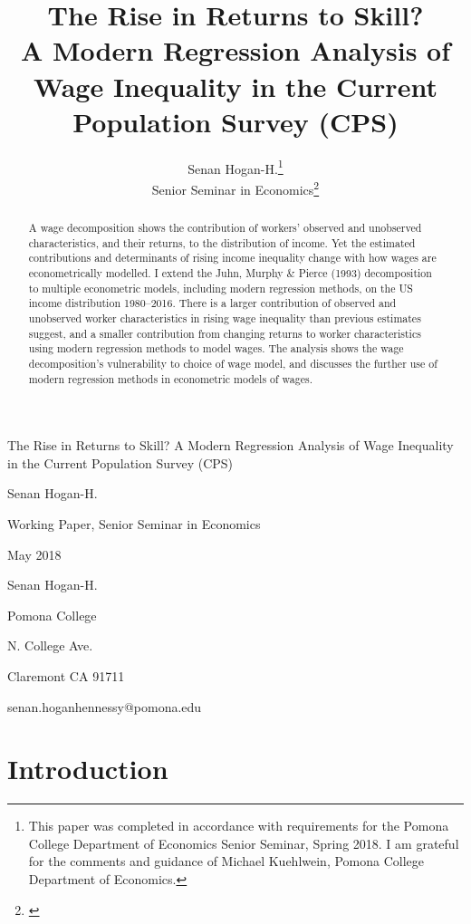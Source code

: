\documentclass[notitlepage,12pt]{article}
\author{Senan Hogan-H.\footnote{This paper was completed in accordance with requirements for the Pomona College Department of Economics Senior Seminar, Spring 2018.  I am grateful for the comments and guidance of Michael Kuehlwein, Pomona College Department of Economics.} \\ Senior Seminar in Economics\footnote{\href{https://github.com/shoganhennessy/ECON190}{\color{blue}{\underline{This project's Github repository, which hosts all contributing materials, is available here.}}}}}
\title{The Rise in Returns to Skill? \\ \Large{A Modern Regression Analysis of Wage Inequality in the Current Population Survey (CPS)}}
\date{\begin{singlespace} \normalsize{
\vfill Pomona College, Department of Economics \\
\noindent 425 N. College Ave.  \\
\noindent Claremont CA 91711   \\
\noindent May 2018}
\end{singlespace}}
\begin{document}
\maketitle
\thispagestyle{empty}

\newpage \thispagestyle{empty}
\begin{singlespace}
\noindent The Rise in Returns to Skill?  A Modern Regression Analysis of Wage Inequality in the Current Population Survey (CPS)

\noindent Senan Hogan-H.

\noindent Working Paper, Senior Seminar in Economics

\noindent May 2018
\end{singlespace}

\begin{abstract} \noindent
A wage decomposition shows the contribution of workers' observed and unobserved characteristics, and their
returns, to the distribution of income.  
Yet the estimated contributions and determinants of rising income inequality change with how wages are
econometrically modelled.
I extend the Juhn, Murphy \& Pierce (1993) decomposition to multiple econometric models, including 
modern regression methods, on the US income distribution 1980--2016.
There is a larger contribution of observed and unobserved worker characteristics 
in rising wage inequality than previous estimates suggest,
and a smaller contribution from changing returns to worker characteristics
using modern regression methods to model wages.
The analysis shows the wage decomposition's vulnerability to choice of wage model,
and discusses the further use of modern regression methods in econometric models of wages.
\end{abstract}
\vfill
\begin{singlespace}
\noindent Senan Hogan-H.

\noindent Pomona College

 N. College Ave.

\noindent Claremont CA 91711
 
\noindent senan.hoganhennessy@pomona.edu
\end{singlespace}


\newpage
\setcounter{page}{1}

\section{Introduction}
\end{document}
